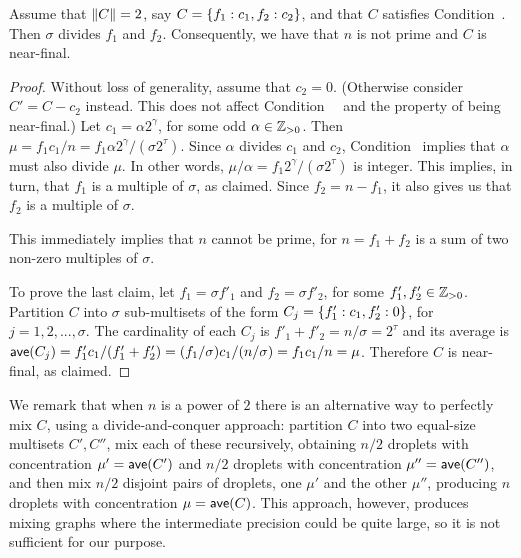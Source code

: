 
\begin{lemma}\label{lem: mixability m = 2}
	Assume that ${\|C\|}=2$, say $C={ \left\{ f_1:c_1,f_2:c_2 \right\} }$,
	and that $C$ satisfies Condition~{\MixCond}.
	Then $\sigma$ divides $f_1$ and $f_2$.
	Consequently, we have that
	$n$ is not prime and $C$ is near-final.
\end{lemma}

\begin{proof}
Without loss of generality, assume that $c_2 = 0$. (Otherwise consider
$C' = C-c_2$ instead. This does not affect Condition~~{\MixCond} and the property of being near-final.)
Let $c_1 = \alpha 2^{\gamma}$, for some odd $\alpha\in{\mathbb{Z}_{> 0}}$. 
Then $\mu = f_1c_1/n = f_1\alpha 2^{\gamma}/(\sigma 2^\tau)$. 
Since $\alpha$ divides $c_1$ and $c_2$, Condition~{\MixCond} implies that 
$\alpha$ must also divide $\mu$. In other words, $\mu/\alpha = f_1 2^{\gamma}/(\sigma 2^\tau)$
is integer. This implies, in turn, that $f_1$ is a multiple of $\sigma$, as claimed.
Since $f_2 = n-f_1$, it also gives us that $f_2$ is a multiple of $\sigma$.    

This immediately implies that $n$ cannot be prime, for $n=f_1+f_2$ is a sum of
two non-zero multiples of $\sigma$.

To prove the last claim,
let $f_1 =\sigma f'_1$ and $f_2 = \sigma f'_2$,  for some $f'_1, f'_2 \in{\mathbb{Z}_{> 0}}$.
Partition $C$ into $\sigma$ sub-multisets of the form $C_j = { \left\{ f_1':c_1,f'_2:0 \right\} }$, for $j=1,2,...,\sigma$.
The cardinality of each $C_j$ is $f'_1+f'_2 = n/\sigma = 2^\tau$ and
its average is ${\textsf{ave}}(C_j) = f'_1c_1/(f'_1+f'_2) = (f_1/\sigma)c_1/(n/\sigma) = f_1c_1/n = \mu$.
Therefore $C$ is near-final, as claimed.
\end{proof}

We remark that when $n$ is a power of $2$ there is an alternative way to
perfectly mix $C$, using a divide-and-conquer approach: partition $C$ into
two equal-size multisets $C', C''$, mix each of these recursively, obtaining
$n/2$ droplets with concentration $\mu' = {\textsf{ave}}(C')$ and $n/2$ droplets
with concentration $\mu'' = {\textsf{ave}}(C'')$, 
and then mix $n/2$ disjoint pairs of droplets, one $\mu'$ and the other $\mu''$,
producing $n$ droplets with concentration $\mu = {\textsf{ave}}(C)$.
This approach, however, produces mixing graphs where the intermediate precision 
could be quite large, so it is not sufficient for our purpose.




